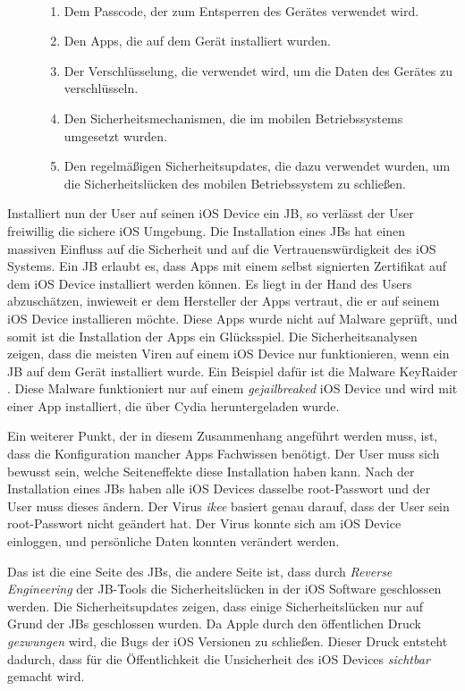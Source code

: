 \begin{description}
    \item[\parbox{\textwidth} {Die Sicherheit und Vertrauenswürdigkeit eines mobilen Gerätes hängt von mehreren Faktoren ab}]~\par
    \begin{enumerate}
        \item Dem Passcode, der zum Entsperren des Gerätes verwendet wird.
        \item Den Apps, die auf dem Gerät installiert wurden. 
        \item Der Verschlüsselung, die verwendet wird, um die Daten des Gerätes zu verschlüsseln.
        \item Den Sicherheitsmechanismen, die im mobilen Betriebssystems umgesetzt wurden.
        \item Den regelmäßigen Sicherheitsupdates, die dazu verwendet wurden, um die Sicherheitslücken des mobilen Betriebssystem zu schließen.  
    \end{enumerate}
\end{description} 
Installiert nun der User auf seinen iOS Device ein JB, so verlässt der User freiwillig die sichere iOS Umgebung. Die Installation eines JBs hat einen massiven Einfluss auf die Sicherheit und auf die Vertrauenswürdigkeit des iOS Systems. Ein JB erlaubt es, dass Apps mit einem selbst signierten Zertifikat auf dem iOS Device installiert werden können. Es liegt in der Hand des Users abzuschätzen, inwieweit er dem Hersteller der Apps vertraut, die er auf seinem iOS Device installieren möchte. Diese Apps wurde nicht auf Malware geprüft, und somit ist die Installation der Apps ein Glücksspiel. Die Sicherheitsanalysen zeigen, dass die meisten Viren auf einem iOS Device nur funktionieren, wenn ein JB auf dem Gerät installiert wurde. Ein Beispiel dafür ist die Malware KeyRaider \cite{KeyRaider}. Diese Malware funktioniert nur auf einem \textit{\glqq gejailbreaked\grqq{}} iOS Device und wird mit einer App installiert, die über Cydia heruntergeladen wurde. \par 
 Ein weiterer Punkt, der in diesem Zusammenhang angeführt werden muss, ist, dass die Konfiguration mancher Apps Fachwissen benötigt. Der User muss sich bewusst sein, welche Seiteneffekte diese Installation haben kann. Nach der Installation eines JBs haben alle iOS Devices dasselbe root-Passwort und der User muss dieses ändern. Der Virus \textit{\glqq ikee\grqq{}} basiert genau darauf, dass der User sein root-Passwort nicht geändert hat. Der Virus konnte sich am iOS Device einloggen, und persönliche Daten konnten verändert werden.\par 
 
Das ist die eine Seite des JBs, die andere Seite ist, dass durch \textit{\glqq Reverse Engineering\grqq{}} der JB-Tools die Sicherheitslücken in der iOS Software geschlossen werden. Die Sicherheitsupdates zeigen, dass einige Sicherheitslücken nur auf Grund der JBs geschlossen wurden. Da Apple durch den öffentlichen Druck \textit{\glqq gezwungen\grqq{}} wird, die Bugs der iOS Versionen zu schließen. Dieser Druck entsteht dadurch, dass für die Öffentlichkeit die Unsicherheit des iOS Devices \textit{\glqq sichtbar\grqq{}} gemacht wird. 



